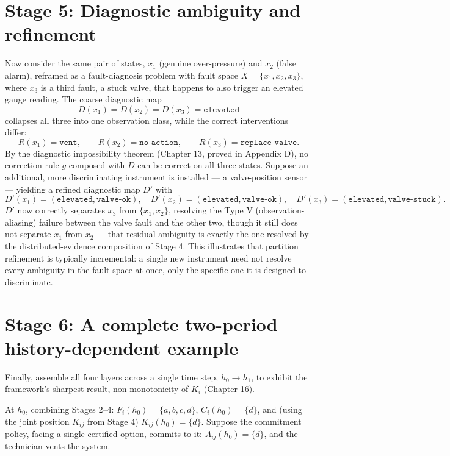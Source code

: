 \documentclass[11pt]{report}
\theoremstyle{definition}
\theoremstyle{plain}
\begin{document}
\section*{Stage 5: Diagnostic ambiguity and refinement}

Now consider the same pair of states, $x_1$ (genuine over-pressure) and $x_2$ (false alarm), reframed as a fault-diagnosis problem with fault space $X = \{x_1, x_2, x_3\}$, where $x_3$ is a third fault, a stuck valve, that happens to also trigger an elevated gauge reading. The coarse diagnostic map
\[
D(x_1) = D(x_2) = D(x_3) = \texttt{elevated}
\]
collapses all three into one observation class, while the correct interventions differ:
\[
R(x_1) = \texttt{vent}, \qquad R(x_2) = \texttt{no action}, \qquad R(x_3) = \texttt{replace valve}.
\]
By the diagnostic impossibility theorem (Chapter 13, proved in Appendix D), no correction rule $g$ composed with $D$ can be correct on all three states. Suppose an additional, more discriminating instrument is installed --- a valve-position sensor --- yielding a refined diagnostic map $D'$ with
\[
D'(x_1) = (\texttt{elevated}, \texttt{valve-ok}), \quad D'(x_2) = (\texttt{elevated}, \texttt{valve-ok}), \quad D'(x_3) = (\texttt{elevated}, \texttt{valve-stuck}).
\]
$D'$ now correctly separates $x_3$ from $\{x_1,x_2\}$, resolving the Type V (observation-aliasing) failure between the valve fault and the other two, though it still does not separate $x_1$ from $x_2$ --- that residual ambiguity is exactly the one resolved by the distributed-evidence composition of Stage 4. This illustrates that partition refinement is typically incremental: a single new instrument need not resolve every ambiguity in the fault space at once, only the specific one it is designed to discriminate.

\section*{Stage 6: A complete two-period history-dependent example}

Finally, assemble all four layers across a single time step, $h_0 \to h_1$, to exhibit the framework's sharpest result, non-monotonicity of $K_i$ (Chapter 16).

At $h_0$, combining Stages 2--4: $F_i(h_0) = \{a,b,c,d\}$, $C_i(h_0) = \{d\}$, and (using the joint position $K_{ij}$ from Stage 4) $K_{ij}(h_0) = \{d\}$. Suppose the commitment policy, facing a single certified option, commits to it: $A_{ij}(h_0) = \{d\}$, and the technician vents the system.
\end{document}
